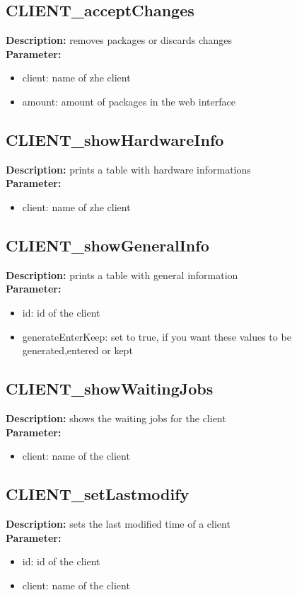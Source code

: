 \subsection{CLIENT\_acceptChanges}
\textbf{Description:} removes packages or discards changes\\
\textbf{Parameter:}
\begin{itemize}
\item client: name of zhe client
\item amount: amount of packages in the web interface
\end{itemize}

\subsection{CLIENT\_showHardwareInfo}
\textbf{Description:} prints a table with hardware informations\\
\textbf{Parameter:}
\begin{itemize}
\item client: name of zhe client
\end{itemize}

\subsection{CLIENT\_showGeneralInfo}
\textbf{Description:} prints a table with general information\\
\textbf{Parameter:}
\begin{itemize}
\item id: id of the client
\item generateEnterKeep: set to true, if you want these values to be generated,entered or kept
\end{itemize}

\subsection{CLIENT\_showWaitingJobs}
\textbf{Description:} shows the waiting jobs for the client\\
\textbf{Parameter:}
\begin{itemize}
\item client: name of the client
\end{itemize}

\subsection{CLIENT\_setLastmodify}
\textbf{Description:} sets the last modified time of a client\\
\textbf{Parameter:}
\begin{itemize}
\item id: id of the client
\item client: name of the client
\end{itemize}

